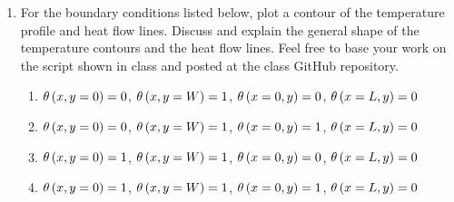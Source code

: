 \documentclass[12pt,letterpaper]{article}
\begin{document}
\begin{enumerate}
\item For the boundary conditions listed below, plot a contour of the temperature profile and heat flow lines.
	Discuss and explain the general shape of the temperature contours and the heat flow lines.
	Feel free to base your work on the script shown in class and posted at the class GitHub repository.

	\begin{enumerate}
		\item $\theta \left( x, y = 0 \right) = 0$, $\theta \left( x, y = W \right) = 1$, $\theta \left( x = 0, y \right) = 0$, $\theta \left( x = L, y \right) = 0$
		\item $\theta \left( x, y = 0 \right) = 0$, $\theta \left( x, y = W \right) = 1$, $\theta \left( x = 0, y \right) = 1$, $\theta \left( x = L, y \right) = 0$
		\item $\theta \left( x, y = 0 \right) = 1$, $\theta \left( x, y = W \right) = 1$, $\theta \left( x = 0, y \right) = 0$, $\theta \left( x = L, y \right) = 0$
		\item $\theta \left( x, y = 0 \right) = 1$, $\theta \left( x, y = W \right) = 1$, $\theta \left( x = 0, y \right) = 1$, $\theta \left( x = L, y \right) = 0$
	\end{enumerate}


\end{enumerate}
\end{document}
